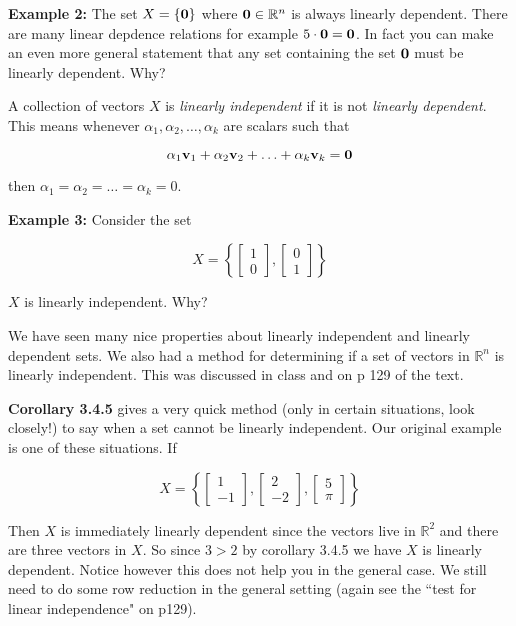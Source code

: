 \documentclass[12pt]{article}
\begin{document}
{\bf Example 2:} The set $X=\{ {\bf 0} \}$ where ${\bf 0}\in \mathbb{R}^n$ is always linearly dependent.  There are many linear depdence relations for example $5 \cdot {\bf 0}={\bf 0}$.  In fact you can make an even more general statement that any set containing the set ${\bf 0}$ must be linearly dependent.  Why?

A collection of vectors $X$ is {\it linearly independent} if it is not {\it linearly dependent}.  This means whenever $\alpha_1,\alpha_2,\ldots,\alpha_k$ are scalars such that 

\[ \alpha_1 {\bf v}_1 + \alpha_2 {\bf v}_2 + \ldots + \alpha_k {\bf v}_k = {\bf 0} \]

then $\alpha_1=\alpha_2=\ldots=\alpha_k=0$.

{\bf Example 3:} Consider the set 

\[X = \left\{ \left[ \begin{array}{r} 1  \\ 0  \end{array} \right], \left[ \begin{array}{r} 0  \\ 1  \end{array} \right] \right\} \]

$X$ is linearly independent. Why?


We have seen many nice properties about linearly independent and linearly dependent sets.  We also had a method for determining if a set of vectors in $\mathbb{R}^n$ is linearly independent.  This was discussed in class and on p 129 of the text.  

{\bf Corollary 3.4.5} gives a very quick method (only in certain situations, look closely!) to say when a set cannot be linearly independent.  Our original example is one of these situations.  If

\[X = \left\{ \left[ \begin{array}{r} 1  \\ -1  \end{array} \right], \left[ \begin{array}{r} 2  \\ -2  \end{array} \right], \left[ \begin{array}{r} 5  \\ \pi  \end{array}\right] \right\} \]

Then $X$ is immediately linearly dependent since the vectors live in $\mathbb{R}^2$ and there are three vectors in $X$.  So since $3>2$ by corollary 3.4.5 we have $X$ is linearly dependent.  Notice however this does not help you in the general case.  We still need to do some row reduction in the general setting (again see the ``test for linear independence" on p129). \\
\end{document}
